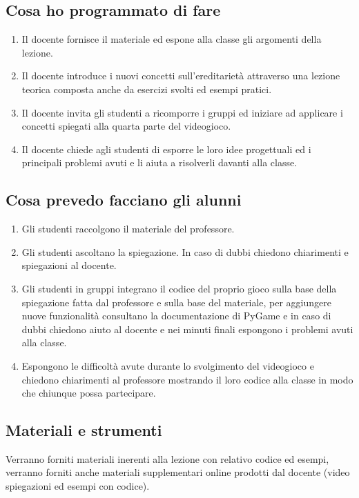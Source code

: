 \documentclass[12pt,a4paper]{article}
\begin{document}
\subsection*{Cosa ho programmato di fare}
\begin{enumerate}
	\item Il docente fornisce il materiale ed espone alla classe gli argomenti della lezione.
\item Il docente introduce i nuovi concetti sull’ereditarietà attraverso una lezione teorica composta anche da esercizi svolti ed esempi pratici.
\item Il docente invita gli studenti a ricomporre i gruppi ed iniziare ad applicare i concetti spiegati alla quarta parte del videogioco.
\item Il docente chiede agli studenti di esporre le loro idee progettuali ed i principali problemi avuti e li aiuta a risolverli davanti alla classe.

\end{enumerate}
\subsection*{Cosa prevedo facciano gli alunni}

\begin{enumerate}
	\item Gli studenti raccolgono il materiale del professore.
\item Gli studenti ascoltano la spiegazione. In caso di dubbi chiedono chiarimenti e spiegazioni al docente.
\item Gli studenti in gruppi integrano il codice del proprio gioco sulla base della spiegazione fatta dal professore e sulla base del materiale, per aggiungere nuove funzionalità consultano la documentazione di PyGame e in caso di dubbi chiedono aiuto al docente e nei minuti finali espongono i problemi avuti alla classe.
\item Espongono le difficoltà avute durante lo svolgimento del videogioco e chiedono chiarimenti al professore mostrando il loro codice alla classe in modo che chiunque possa partecipare.

\end{enumerate}

\subsection*{Materiali e strumenti}
Verranno forniti materiali inerenti alla lezione con relativo codice ed esempi, verranno forniti anche materiali supplementari online prodotti dal docente (video spiegazioni ed esempi con codice).
\end{document}
